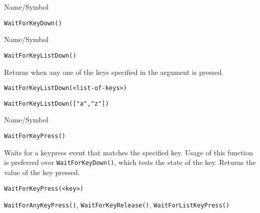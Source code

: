 \rl


\begin{desc}{Name/Symbol}
\item[Name/Symbol]  	\verb+WaitForKeyDown()+

\item[Description]	

\item[Usage]		

\item[Example]	

\item[See Also]	
\end{desc}

\rl


\begin{desc}{Name/Symbol}
\item[Name/Symbol]  	\verb+WaitForKeyListDown()+

\item[Description] Returns when any one of the keys specified in the
  argument is pressed.

\item[Usage]
\begin{verbatim}
WaitForKeyListDown(<list-of-keys>)
\end{verbatim}

\item[Example]     	
\begin{verbatim}
WaitForKeyListDown(["a","z"])
\end{verbatim}

\item[See Also]	
 \end{desc}

\rl


\begin{desc}{Name/Symbol}
\item[Name/Symbol]  	\verb+WaitForKeyPress()+

\item[Description] Waits for a keypress event that matches the
  specified key.  Usage of this function is preferred over
  \verb+WaitForKeyDown()+, which tests the state of the key. Returns the
  value of the key pressed.

\item[Usage]
\begin{verbatim}
WaitForKeyPress(<key>)
\end{verbatim}

\item[Example]	

\item[See Also]     	\verb+WaitForAnyKeyPress()+, \verb+WaitForKeyRelease()+, \verb+WaitForListKeyPress()+
\end{desc}

